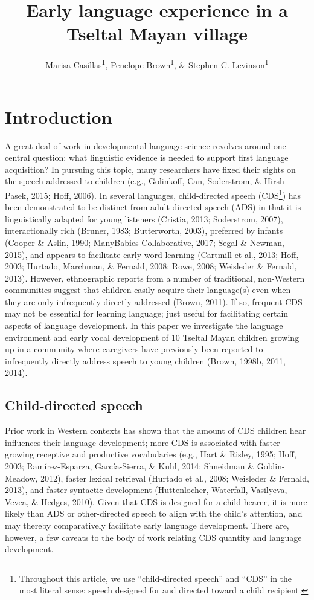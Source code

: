 \documentclass[floatsintext,man]{apa6}
\title{Early language experience in a Tseltal Mayan village}
\author{Marisa Casillas\textsuperscript{1}, Penelope Brown\textsuperscript{1}, \& Stephen C. Levinson\textsuperscript{1}}
\affiliation{
    \vspace{0.5cm}
          \textsuperscript{1} Max Planck Institute for Psycholinguistics  }
\theoremstyle{definition}
\theoremstyle{definition}
\theoremstyle{definition}
\theoremstyle{remark}
\begin{document}
\maketitle

\setcounter{secnumdepth}{0}



\section{Introduction}\label{intro}

A great deal of work in developmental language science revolves around
one central question: what linguistic evidence is needed to support
first language acquisition? In pursuing this topic, many researchers
have fixed their sights on the speech addressed to children (e.g.,
Golinkoff, Can, Soderstrom, \& Hirsh-Pasek, 2015; Hoff, 2006). In
several languages, child-directed speech (CDS\footnote{Throughout this
  article, we use \enquote{child-directed speech} and \enquote{CDS} in
  the most literal sense: speech designed for and directed toward a
  child recipient.}) has been demonstrated to be distinct from
adult-directed speech (ADS) in that it is linguistically adapted for
young listeners (Cristia, 2013; Soderstrom, 2007), interactionally rich
(Bruner, 1983; Butterworth, 2003), preferred by infants (Cooper \&
Aslin, 1990; ManyBabies Collaborative, 2017; Segal \& Newman, 2015), and
appears to facilitate early word learning (Cartmill et al., 2013; Hoff,
2003; Hurtado, Marchman, \& Fernald, 2008; Rowe, 2008; Weisleder \&
Fernald, 2013). However, ethnographic reports from a number of
traditional, non-Western communities suggest that children easily
acquire their language(s) even when they are only infrequently directly
addressed (Brown, 2011). If so, frequent CDS may not be essential for
learning language; just useful for facilitating certain aspects of
language development. In this paper we investigate the language
environment and early vocal development of 10 Tseltal Mayan children
growing up in a community where caregivers have previously been reported
to infrequently directly address speech to young children (Brown, 1998b,
2011, 2014).

\subsection{Child-directed speech}\label{intro-cds}

Prior work in Western contexts has shown that the amount of CDS children
hear influences their language development; more CDS is associated with
faster-growing receptive and productive vocabularies (e.g., Hart \&
Risley, 1995; Hoff, 2003; Ramírez-Esparza, García-Sierra, \& Kuhl, 2014;
Shneidman \& Goldin-Meadow, 2012), faster lexical retrieval (Hurtado et
al., 2008; Weisleder \& Fernald, 2013), and faster syntactic development
(Huttenlocher, Waterfall, Vasilyeva, Vevea, \& Hedges, 2010). Given that
CDS is designed for a child hearer, it is more likely than ADS or
other-directed speech to align with the child's attention, and may
thereby comparatively facilitate early language development. There are,
however, a few caveats to the body of work relating CDS quantity and
language development.
\end{document}
